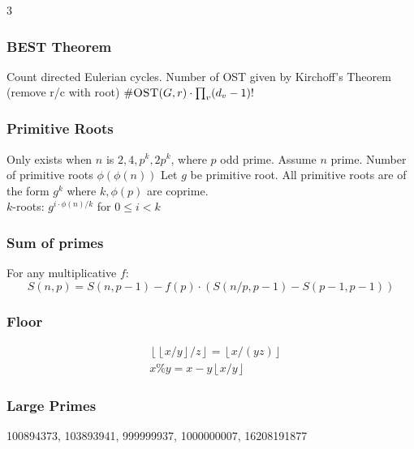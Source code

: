 \documentclass[a4paper, 8pt, landscape, oneside]{extarticle}
\begin{document}
\begin{multicols*}{3}
          \subsubsection{BEST Theorem}
            Count directed Eulerian cycles. Number of OST given by
            Kirchoff's Theorem (remove r/c with root) $\#\textsc{OST}(G,r)
            \cdot \prod_{v}(d_v-1)!$
      
          \subsubsection{Primitive Roots}
            Only exists when $n$ is $2, 4, p^k, 2p^k$, where $p$ odd prime. Assume
            $n$ prime. Number of primitive roots $\phi(\phi(n))$
            Let $g$ be primitive root. All primitive roots are of the form $g^k$
            where $k,\phi(p)$ are coprime.\\ $k$-roots:
            $g^{i \cdot \phi(n) / k}$ for $0 \leq i < k$
      
          \subsubsection{Sum of primes} For any multiplicative $f$:
            \[
                S(n,p) = S(n, p-1) - f(p) \cdot (S(n/p,p-1) - S(p-1,p-1))
            \]
      
          \subsubsection{Floor}
            \begin{align*}
                &\left\lfloor \left\lfloor x/y \right\rfloor / z \right\rfloor = \left\lfloor x / (yz) \right\rfloor \\
                &x \% y = x - y \left\lfloor x / y \right\rfloor
            \end{align*}
            
          \subsubsection{Large Primes}
            100894373, 103893941, 999999937, 1000000007, 16208191877
        \newpage

\end{multicols*}
\end{document}
